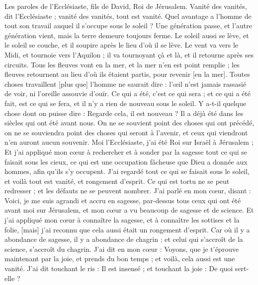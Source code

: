 \BFont
\begin{multicols}{2}
\VerseOne{}Les paroles de l'Ecclésiaste, fils de David, Roi de Jérusalem.
Vanité des vanités, dit l'Ecclésiaste ; vanité des vanités, tout est vanité.
Quel avantage a l'homme de tout son travail auquel il s'occupe sous le soleil ?
Une génération passe, et l'autre génération vient, mais la terre demeure toujours ferme.
Le soleil aussi se lève, et le soleil se couche, et il soupire après le lieu d'où il se lève.
Le vent va vers le Midi, et tournoie vers l'Aquilon ; il va tournoyant çà et là, et il retourne après ses circuits.
Tous les fleuves vont en la mer, et la mer n'en est point remplie ; les fleuves retournent au lieu d'où ils étaient partis, pour revenir [en la mer].
Toutes choses travaillent [plus que] l'homme ne saurait dire : l'œil n'est jamais rassasié de voir, ni l'oreille assouvie d'ouïr.
Ce qui a été, c'est ce qui sera ; et ce qui a été fait, est ce qui se fera, et il n'y a rien de nouveau sous le soleil.
Y a-t-il quelque chose dont on puisse dire : Regarde cela, il est nouveau ? Il a déjà été dans les siècles qui ont été avant nous.
On ne se souvient point des choses qui ont précédé, on ne se souviendra point des choses qui seront à l'avenir, et ceux qui viendront n'en auront aucun souvenir.
Moi l'Ecclésiaste, j'ai été Roi sur Israël à Jérusalem ;
Et j'ai appliqué mon cœur à rechercher et à sonder par la sagesse tout ce qui se faisait sous les cieux, ce qui est une occupation fâcheuse que Dieu a donnée aux hommes, afin qu'ils s'y occupent.
J'ai regardé tout ce qui se faisait sous le soleil, et voilà tout est vanité, et rongement d'esprit.
Ce qui est tortu ne se peut redresser ; et les défauts ne se peuvent nombrer.
J'ai parlé en mon cœur, disant : Voici, je me suis agrandi et accru en sagesse, par-dessus tous ceux qui ont été avant moi sur Jérusalem, et mon cœur a vu beaucoup de sagesse et de science.
Et j'ai appliqué mon cœur à connaître la sagesse, et à connaître les sottises et la folie, [mais] j'ai reconnu que cela aussi était un rongement d'esprit.
Car où il y a abondance de sagesse, il y a abondance de chagrin ; et celui qui s'accroît de la science, s'accroît du chagrin.
\VerseOne{}J'ai dit en mon cœur : Voyons, que je t'éprouve maintenant par la joie, et prends du bon temps ; et voilà, cela aussi est une vanité.
J'ai dit touchant le ris : Il est insensé ; et touchant la joie : De quoi sert-elle ?

\end{multicols}
